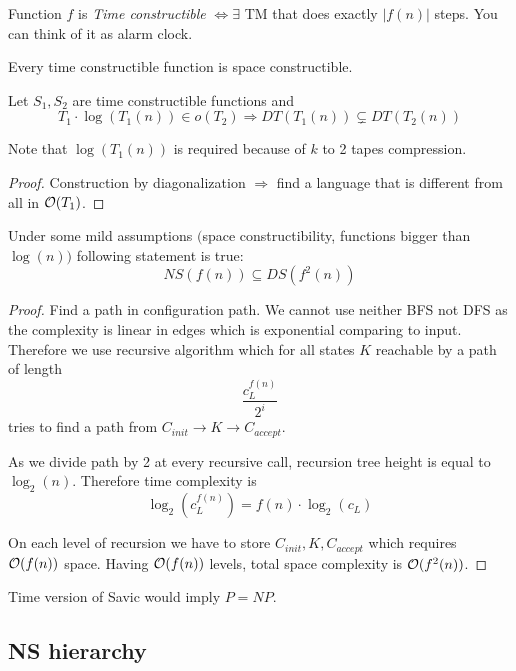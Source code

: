 \begin{definition}
	Function $f$ is \emph{Time constructible} $\iff \exists$ TM that does exactly $|f(n)|$ steps. You can think of it as alarm clock.
\end{definition}

\begin{note}
	Every time constructible function is space constructible.
\end{note}

\begin{theorem}\label{t_hier}
	Let $S_1, S_2$ are time constructible functions and
	\[ T_1 \cdot \log(T_1(n)) \in o(T_2) \Rightarrow DT(T_1(n)) \subsetneq DT(T_2(n)) \]

	Note that $\log(T_1(n))$ is required because of $k$ to 2 tapes compression.
\end{theorem}
\begin{proof}
	Construction by diagonalization $\Rightarrow$ find a language that is different from all in $\mathcal{O}(T_1)$.
\end{proof}

\begin{theorem}[Savic]\label{savic}
	Under some mild assumptions $($space constructibility, functions bigger than $\log(n))$ following statement is true:
	\[ NS(f(n)) \subseteq DS(f^2(n)) \]

\end{theorem}
\begin{proof}
	Find a path in configuration path. We cannot use neither BFS not DFS as the complexity is linear in edges which is exponential comparing to input.
	Therefore we use recursive algorithm which for all states $K$ reachable by a path of length
	\[ \frac{c_L^{f(n)}}{2^i}\]
	tries to find a path from $C_{init} \to K \to C_{accept}$.

	As we divide path by 2 at every recursive call, recursion tree height is equal to $\log_2(n)$.
	Therefore time complexity is
	\[ \log_2(c_L^{f(n)}) = f(n) \cdot \log_2(c_L) \]

	On each level of recursion we have to store $C_{init}, K, C_{accept}$ which requires $\mathcal{O}(f(n))$ space.
	Having $\mathcal{O}(f(n))$ levels, total space complexity is $\mathcal{O}(f^2(n))$.
\end{proof}

\begin{note}
	Time version of Savic would imply $P = NP$.
\end{note}

\subsection{NS hierarchy}

